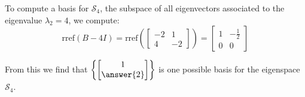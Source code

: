 \documentclass{ximera}
\begin{document}
\begin{example}
\begin{explanation}
To compute a basis for $\mathcal{S}_4$, the subspace of all eigenvectors associated to the eigenvalue $\lambda_2=4$, we compute:
$$\mbox{rref}(B-4I)=\mbox{rref}\left(\begin{bmatrix}-2&1\\4&-2\end{bmatrix}\right)=\begin{bmatrix}1&-\frac{1}{2}\\0&0\end{bmatrix}$$


From this we find that $\left\{\begin{bmatrix}1\\\answer{2}\end{bmatrix}\right\}$ is one possible basis for the eigenspace $\mathcal{S}_4$.
\end{explanation}
\end{example}
\end{document}
